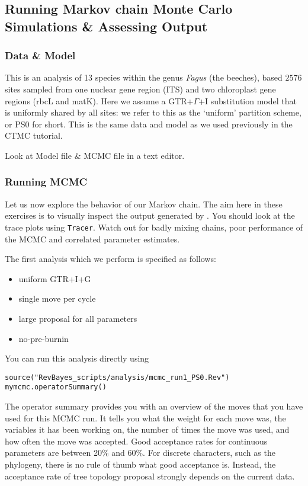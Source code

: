 \subsection{Running Markov chain Monte Carlo Simulations \& Assessing Output}\label{secUnif} 


\subsubsection{Data \& Model}

This is an analysis of 13 species within the genus \emph{Fagus} (the beeches), based 
$2576$ sites sampled from one nuclear gene region (ITS) and two chloroplast gene regions
(rbcL and matK).
Here we assume a GTR+$\Gamma$+I substitution model that is uniformly shared by all sites:
we refer to this as the `uniform' partition scheme, or PS0 for short.
This is the same data and model as we used previously in the CTMC tutorial.

Look at Model file \& MCMC file in a text editor.


\subsubsection{Running MCMC}

Let us now explore the behavior of our Markov chain.
The aim here in these exercises is to visually inspect the output generated by \RevBayes.
You should look at the trace plots using \verb!Tracer!.
Watch out for badly mixing chains, poor performance of the MCMC and correlated parameter estimates.


The first analysis which we perform is specified as follows:
\begin{itemize}
\item{uniform GTR+I+G}
\item{single move per cycle}
\item{large proposal for all parameters}
\item{no-pre-burnin}
\end{itemize}
You can run this analysis directly using
{\tt \begin{snugshade*}
\begin{lstlisting}
source("RevBayes_scripts/analysis/mcmc_run1_PS0.Rev")
mymcmc.operatorSummary()
\end{lstlisting}
\end{snugshade*}}
The operator summary provides you with an overview of the moves that you have used for this MCMC run.
It tells you what the weight for each move was, the variables it has been working on, the number of times the move was used, and how often the move was accepted.
Good acceptance rates for continuous parameters are between 20\% and 60\%.
For discrete characters, such as the phylogeny, there is no rule of thumb what good acceptance is.
Instead, the acceptance rate of tree topology proposal strongly depends on the current data.

